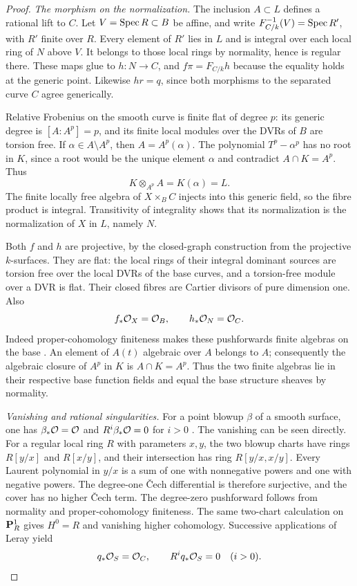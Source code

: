 \begin{proof}
\emph{The morphism on the normalization.}
The inclusion $A\subset L$ defines a rational lift to $C$.
Let $V=\operatorname{Spec} R\subset B$ be affine, and write
$F_{C/k}^{-1}(V)=\operatorname{Spec} R'$, with $R'$ finite over $R$.
Every element of $R'$ lies in $L$ and is integral over each local ring
of $N$ above $V$. It belongs to those local rings by normality, hence
is regular there. These maps glue to $h:N\to C$, and
$f\pi=F_{C/k}h$ because the equality holds at the generic point.
Likewise $hr=q$, since both morphisms to the separated curve $C$
agree generically.

Relative Frobenius on the smooth curve is finite flat of degree $p$:
its generic degree is $[A:A^p]=p$, and its finite local modules over
the DVRs of $B$ are torsion free. If $\alpha\in A\setminus A^p$, then
$A=A^p(\alpha)$. The polynomial $T^p-\alpha^p$ has no root in $K$,
since a root would be the unique element $\alpha$ and contradict
$A\cap K=A^p$. Thus
\[
 K\otimes_{A^p}A=K(\alpha)=L.
\]
The finite locally free algebra of $X\times_B C$ injects into this
generic field, so the fibre product is integral. Transitivity of
integrality shows that its normalization is the normalization of
$X$ in $L$, namely $N$.

Both $f$ and $h$ are projective, by the closed-graph construction from
the projective $k$-surfaces. They are flat: the local rings of their
integral dominant sources are torsion free over the local DVRs of
the base curves, and a torsion-free module over a DVR is flat.
Their closed fibres are Cartier divisors of pure dimension one.
Also
\begin{equation}\label{eq:positive-genus-functions}
 f_*\mathcal O_X=\mathcal O_B,\qquad h_*\mathcal O_N=\mathcal O_C.
\end{equation}
Indeed proper-cohomology finiteness makes these pushforwards finite
algebras on the base \cite[III, Theorem~3.2.1]{EGA}.
An element of $A(t)$ algebraic over $A$ belongs to $A$; consequently
the algebraic closure of $A^p$ in $K$ is $A\cap K=A^p$.
Thus the two finite algebras lie in their respective base function
fields and equal the base structure sheaves by normality.

\emph{Vanishing and rational singularities.}
For a point blowup $\beta$ of a smooth surface, one has
$\beta_*\mathcal O=\mathcal O$ and $R^i\beta_*\mathcal O=0$ for $i>0$
\cite[Tag~0AGP, Lemma~54.3.4]{Stacks}.
The vanishing can be seen directly. For a regular local ring $R$
with parameters $x,y$, the two blowup charts have rings
$R[y/x]$ and $R[x/y]$, and their intersection has ring
$R[y/x,x/y]$. Every Laurent polynomial in $y/x$ is a sum of one
with nonnegative powers and one with negative powers. The degree-one
\v{C}ech differential is therefore surjective, and the cover has no
higher \v{C}ech term. The degree-zero pushforward follows from
normality and proper-cohomology finiteness.
The same two-chart calculation on $\mathbf P^1_R$ gives $H^0=R$ and
vanishing higher cohomology. Successive applications of Leray yield
\[
 q_*\mathcal O_S=\mathcal O_C,\qquad R^iq_*\mathcal O_S=0\quad(i>0).
\]


\end{proof}
